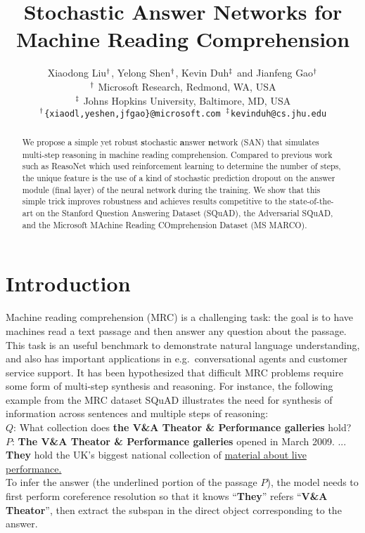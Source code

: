 \documentclass[11pt,a4paper]{article}
\title{Stochastic Answer Networks for Machine Reading Comprehension}
\author{Xiaodong Liu$^\bold{\dagger}$, Yelong Shen$^\bold{\dagger}$, Kevin Duh$^\bold{\ddagger}$ and Jianfeng Gao$^\bold{\dagger}$ \\
  $^\bold{\dagger}$    
  Microsoft Research, Redmond, WA, USA \\
  $^\bold{\ddagger}$
  Johns Hopkins University, Baltimore, MD, USA \\
  {\tt $^\bold{\dagger}$\{xiaodl,yeshen,jfgao\}@microsoft.com
   $^\bold{\ddagger}$kevinduh@cs.jhu.edu}
}
\date{}
\begin{document}
\maketitle
\begin{abstract}
We propose a simple yet robust \textbf{s}tochastic \textbf{a}nswer \textbf{n}etwork (SAN) that simulates multi-step reasoning in machine reading comprehension. 
Compared to previous work such as ReasoNet which used reinforcement learning to determine the number of steps, the unique feature is the use of a kind of stochastic prediction dropout on the answer module (final layer) of the neural network during the training. 
We show that this simple trick improves robustness and achieves results competitive to the state-of-the-art on the Stanford Question Answering Dataset (SQuAD), the Adversarial SQuAD, and the Microsoft MAchine Reading COmprehension Dataset (MS MARCO).
\end{abstract}

\section{Introduction}
\label{sec:intro}
Machine reading comprehension (MRC) is a challenging task: the goal is to have machines read a text passage and then answer any question about the passage.
This task is an useful benchmark to demonstrate natural language understanding, and also has important applications in e.g.~conversational agents and customer service support.
It has been hypothesized that difficult MRC problems require some form of multi-step synthesis and reasoning. 
For instance, the following example from the MRC dataset SQuAD \cite{rajpurkar2016squad} illustrates the need for synthesis of information across sentences and multiple steps of reasoning:\\[0.2cm]
$Q$: What collection does \textbf{the V\&A Theator \& Performance galleries} hold?\\[0.2cm]
$P$: \textbf{The V\&A Theator \& Performance galleries} opened in March 2009. ... \textbf{They} hold the UK's biggest national collection of \underline{material about live performance.}\\[0.2cm]
To infer the answer (the underlined portion of the passage $P$), the model needs to first perform coreference resolution so that it knows ``\textbf{They}'' refers ``\textbf{V\&A Theator}'', then extract the subspan in the direct object corresponding to the answer. 
\end{document}
